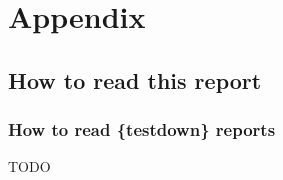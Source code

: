 \documentclass[
]{book}
\begin{document}
\hypertarget{part-appendix}{%
\part{Appendix}\label{part-appendix}}

\hypertarget{how-to-read-this-report}{%
\chapter*{How to read this report}\label{how-to-read-this-report}}

\hypertarget{how-to-read-testdown-reports}{%
\section*{How to read \{testdown\} reports}\label{how-to-read-testdown-reports}}

TODO
\end{document}
